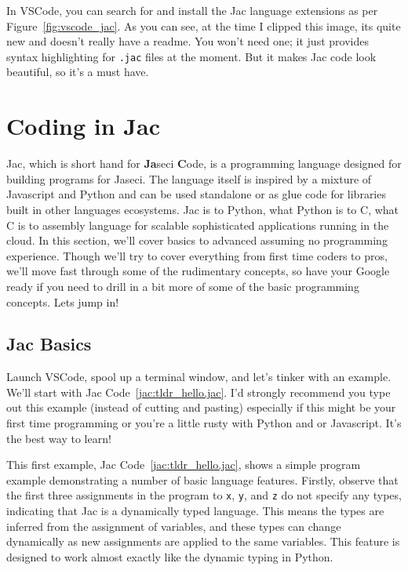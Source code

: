 \par
In VSCode, you can search for and install the Jac language extensions as per Figure~\ref{fig:vscode_jac}. As you can see, at the time I clipped this image, its quite new and doesn't really have a readme. You won't need one; it just provides syntax highlighting for \texttt{.jac} files at the moment. But it makes Jac code look beautiful, so it's a must have.

\section{Coding in Jac}

Jac, which is short hand for \textbf{Ja}seci \textbf{C}ode,  is a programming language designed for building programs for Jaseci. The language itself is inspired by a mixture of Javascript and Python and can be used standalone or as glue code for libraries built in other languages ecosystems. Jac is to Python, what Python is to C, what C is to assembly language for scalable sophisticated applications running in the cloud. In this section, we'll cover basics to advanced assuming no programming experience. Though we'll try to cover everything from first time coders to pros, we'll move fast through some of the rudimentary concepts, so have your Google ready if you need to drill in a bit more of some of the basic programming concepts. Lets jump in!

\subsection{Jac Basics}

Launch VSCode, spool up a terminal window, and let's tinker with an example. We'll start with Jac Code~\ref{jac:tldr_hello.jac}. I'd strongly recommend you type out this example (instead of cutting and pasting) especially if this might be your first time programming or you're a little rusty with Python and or Javascript. It's the best way to learn!

\par
{}

This first example, Jac Code~\ref{jac:tldr_hello.jac}, shows a simple program example demonstrating a number of basic language features. Firstly, observe that the first three assignments in the program to \texttt{x}, \texttt{y}, and \texttt{z} do not specify any types, indicating that Jac is a \gls{dynamically typed language}. This means the types are inferred from the assignment of variables, and these types can change dynamically as new assignments are applied to the same variables. This feature is designed to work almost exactly like the dynamic typing in Python.

